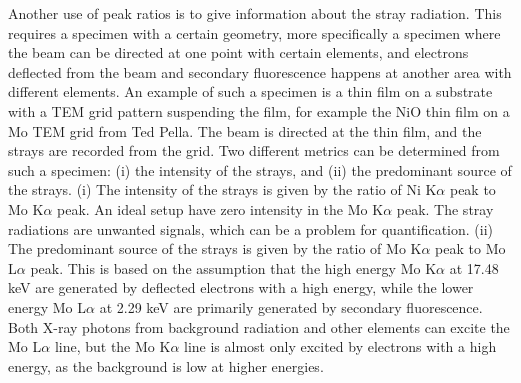 Another use of peak ratios is to give information about the stray radiation.
This requires a specimen with a certain geometry, more specifically a specimen where the beam can be directed at one point with certain elements, and electrons deflected from the beam and secondary fluorescence happens at another area with different elements.
An example of such a specimen is a thin film on a substrate with a TEM grid pattern suspending the film, for example the NiO thin film on a Mo TEM grid from Ted Pella.
The beam is directed at the thin film, and the strays are recorded from the grid.
Two different metrics can be determined from such a specimen: (i) the intensity of the strays, and (ii) the predominant source of the strays.
(i) The intensity of the strays is given by the ratio of Ni K$\alpha$ peak to Mo K$\alpha$ peak.
An ideal setup have zero intensity in the Mo K$\alpha$ peak.
The stray radiations are unwanted signals, which can be a problem for quantification.
(ii) The predominant source of the strays is given by the ratio of Mo K$\alpha$ peak to Mo L$\alpha$ peak.
This is based on the assumption that the high energy Mo K$\alpha$ at 17.48 keV are generated by deflected electrons with a high energy, while the lower energy Mo L$\alpha$ at 2.29 keV are primarily generated by secondary fluorescence.
Both X-ray photons from background radiation and other elements can excite the Mo L$\alpha$ line, but the Mo K$\alpha$ line is almost only excited by electrons with a high energy, as the background is low at higher energies.








